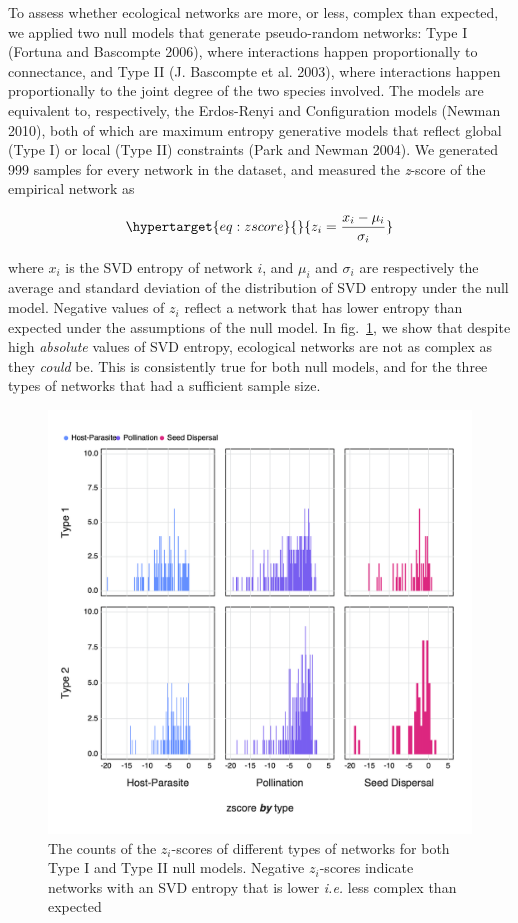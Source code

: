 \documentclass[10pt,oneside]{article}
\makeatletter
\def\maxwidth{\ifdim\Gin@nat@width>\linewidth\linewidth
\else\Gin@nat@width\fi}
\let\Oldincludegraphics\includegraphics
\renewcommand{\includegraphics}[1]{\Oldincludegraphics[width=\maxwidth]{#1}}
\makeatother
\begin{document}
To assess whether ecological networks are more, or less, complex than
expected, we applied two null models that generate pseudo-random
networks: Type I (Fortuna and Bascompte 2006), where interactions happen
proportionally to connectance, and Type II (J. Bascompte et al. 2003),
where interactions happen proportionally to the joint degree of the two
species involved. The models are equivalent to, respectively, the
Erdos-Renyi and Configuration models (Newman 2010), both of which are
maximum entropy generative models that reflect global (Type I) or local
(Type II) constraints (Park and Newman 2004). We generated 999 samples
for every network in the dataset, and measured the \emph{z}-score of the
empirical network as

\begin{equation}\protect\hypertarget{eq:zscore}{}{z_i = \frac{x_i-\mu_i}{\sigma_i}}\label{eq:zscore}\end{equation}

where \(x_i\) is the SVD entropy of network \(i\), and \(\mu_i\) and
\(\sigma_i\) are respectively the average and standard deviation of the
distribution of SVD entropy under the null model. Negative values of
\(z_i\) reflect a network that has lower entropy than expected under the
assumptions of the null model. In fig.~\ref{fig:nullmod}, we show that
despite high \emph{absolute} values of SVD entropy, ecological networks
are not as complex as they \emph{could} be. This is consistently true
for both null models, and for the three types of networks that had a
sufficient sample size.

\begin{figure}
\hypertarget{fig:nullmod}{%
\centering
\includegraphics{figures/nullmodel_histogram.png}
\caption{The counts of the \(z_i\)-scores of different types of networks
for both Type I and Type II null models. Negative \(z_i\)-scores
indicate networks with an SVD entropy that is lower \emph{i.e.} less
complex than expected}\label{fig:nullmod}
}
\end{figure}
\end{document}
